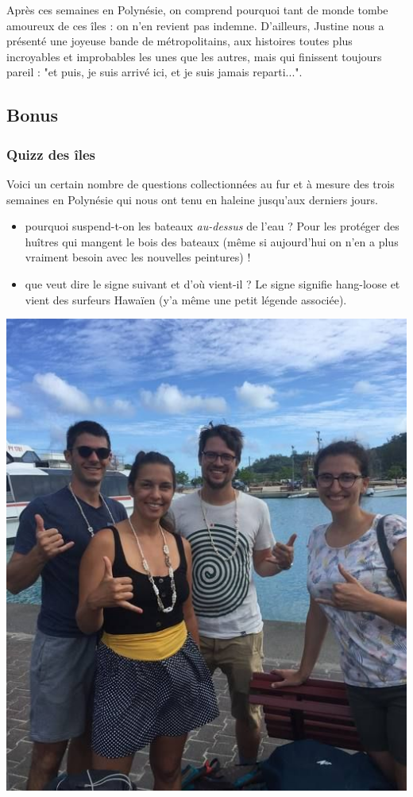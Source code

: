 Après ces semaines en Polynésie, on comprend pourquoi tant de monde
tombe amoureux de ces îles : on n'en revient pas indemne. D'ailleurs,
Justine nous a présenté une joyeuse bande de métropolitains, aux
histoires toutes plus incroyables et improbables les unes que les
autres, mais qui finissent toujours pareil : "et puis, je suis arrivé
ici, et je suis jamais reparti...".

\hypertarget{bonus}{%
\subsection{Bonus}\label{bonus}}

\hypertarget{quizz-des-uxeeles}{%
\subsubsection{Quizz des îles}\label{quizz-des-uxeeles}}

Voici un certain nombre de questions collectionnées au fur et à mesure
des trois semaines en Polynésie qui nous ont tenu en haleine jusqu'aux
derniers jours.

\begin{itemize}
\tightlist
\item
  pourquoi suspend-t-on les bateaux \emph{au-dessus} de l'eau ? Pour les
  protéger des huîtres qui mangent le bois des bateaux (même si
  aujourd'hui on n'en a plus vraiment besoin avec les nouvelles
  peintures) !
\item
  que veut dire le signe suivant et d'où vient-il ? Le signe signifie
  hang-loose et vient des surfeurs Hawaïen (y'a même une petit légende
  associée).
\end{itemize}

\includegraphics{images/20180820_hangloose.jpg}


